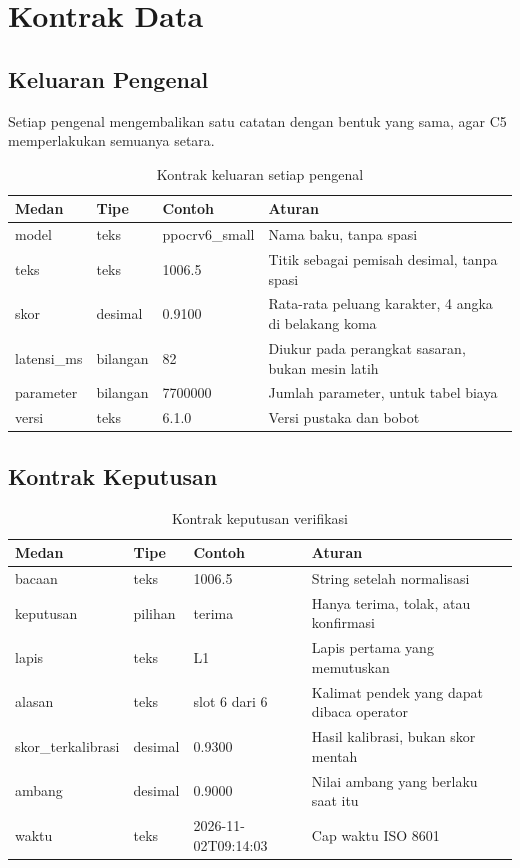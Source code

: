 \documentclass[12pt,a4paper,oneside]{report}
\begin{document}
\chapter{Kontrak Data}

\section{Keluaran Pengenal}

Setiap pengenal mengembalikan satu catatan dengan bentuk yang sama, agar C5
memperlakukan semuanya setara.

\begin{table}[H]
\caption{Kontrak keluaran setiap pengenal}
\label{tab:kontrak-pengenal}
\begin{tabularx}{\textwidth}{@{}L{2.4cm} L{1.8cm} L{3.2cm} X@{}}
\toprule
\textbf{Medan} & \textbf{Tipe} & \textbf{Contoh} & \textbf{Aturan} \\
\midrule
model & teks & ppocrv6\_small & Nama baku, tanpa spasi \\
teks & teks & 1006.5 & Titik sebagai pemisah desimal, tanpa spasi \\
skor & desimal & 0.9100 & Rata-rata peluang karakter, 4 angka di belakang koma \\
latensi\_ms & bilangan & 82 & Diukur pada perangkat sasaran, bukan mesin latih \\
parameter & bilangan & 7700000 & Jumlah parameter, untuk tabel biaya \\
versi & teks & 6.1.0 & Versi pustaka dan bobot \\
\bottomrule
\end{tabularx}
\end{table}

\section{Kontrak Keputusan}

\begin{table}[H]
\caption{Kontrak keputusan verifikasi}
\label{tab:kontrak-keputusan}
\begin{tabularx}{\textwidth}{@{}L{2.4cm} L{1.8cm} L{3.0cm} X@{}}
\toprule
\textbf{Medan} & \textbf{Tipe} & \textbf{Contoh} & \textbf{Aturan} \\
\midrule
bacaan & teks & 1006.5 & String setelah normalisasi \\
keputusan & pilihan & terima & Hanya terima, tolak, atau konfirmasi \\
lapis & teks & L1 & Lapis pertama yang memutuskan \\
alasan & teks & slot 6 dari 6 & Kalimat pendek yang dapat dibaca operator \\
skor\_terkalibrasi & desimal & 0.9300 & Hasil kalibrasi, bukan skor mentah \\
ambang & desimal & 0.9000 & Nilai ambang yang berlaku saat itu \\
waktu & teks & 2026-11-02T09:14:03 & Cap waktu ISO 8601 \\
\bottomrule
\end{tabularx}
\end{table}
\end{document}
